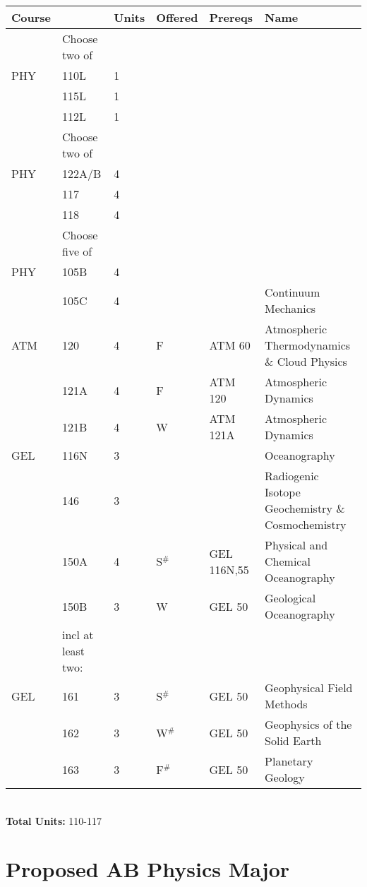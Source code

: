 \documentclass[12pt]{article}
\begin{document}
\begin{tabular}{|llllll|}
\hline
Course & & Units & Offered & Prereqs & Name \\
\hline
    & Choose two of & & & & \\
\hline
PHY & 110L   & 1 & & & \\
    & 115L   & 1 & & & \\
    & 112L   & 1 & & & \\
\hline
\hline
    & Choose two of & & & & \\
\hline
PHY & 122A/B & 4 & & & \\
    & 117   & 4 & & & \\
    & 118   & 4 & & & \\
\hline
\hline
    & Choose five of & & & & \\
\hline
PHY  & 105B   & 4 & &  & \\
     & 105C   & 4 & &  & Continuum Mechanics\\
ATM  & 120    & 4 & F  & ATM 60    & Atmospheric Thermodynamics \& Cloud Physics \\
     & 121A   & 4 & F  & ATM 120   & Atmospheric Dynamics \\
     & 121B   & 4 & W  & ATM 121A  & Atmospheric Dynamics \\
GEL  & 116N   & 3 &    & & Oceanography\\
     & 146    & 3 &    & & Radiogenic Isotope Geochemistry \& Cosmochemistry \\
     & 150A   & 4 & S$^\#$ & GEL 116N,55 & Physical and Chemical Oceanography\\
     & 150B   & 3 & W  & GEL 50      & Geological Oceanography\\
\hline
     & incl at least two:  & & & & \\
\hline
GEL  & 161    & 3 & S$^\#$ & GEL 50 & Geophysical Field Methods \\
     & 162    & 3 & W$^\#$ & GEL 50 & Geophysics of the Solid Earth \\
     & 163    & 3 & F$^\#$ & GEL 50 & Planetary Geology \\
\hline
\end{tabular}\\
\vskip 0.25cm
\noindent
{\bf Total Units:} 110-117 \\



\newpage
\section{Proposed AB Physics Major}
\label{sec:ab}
\end{document}
